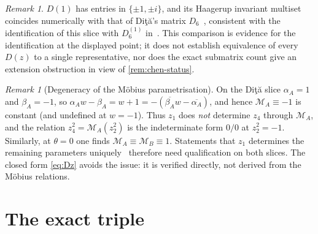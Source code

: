 \documentclass[11pt]{article}
\numberwithin{equation}{section}
\theoremstyle{plain}
\theoremstyle{definition}
\theoremstyle{remark}
\newtheorem{remark}[theorem]{Remark}
\newcommand{\Dita}{\texorpdfstring{Di\c{t}\u{a}}{Dita}}
\begin{document}
\begin{remark}\label{rem:dita-class}
$D(1)$ has entries in $\{\pm1,\pm i\}$, and its Haagerup invariant multiset coincides numerically with that of \Dita{}'s matrix $D_6$~\cite{Dita2004}, consistent with the identification of this slice with $D_6^{(1)}$ in~\cite{McNultyWeigert2026}. This comparison is evidence for the identification at the displayed point; it does not establish equivalence of every $D(z)$ to a single representative, nor does the exact submatrix count give an extension obstruction in view of \cref{rem:chen-status}.
\end{remark}

\begin{remark}[Degeneracy of the M\"obius parametrisation]\label{rem:mobius}
On the \Dita{} slice $\alpha_A=1$ and $\beta_A=-1$, so $\alpha_Aw-\beta_A=w+1=-(\overline{\beta_A}w-\overline{\alpha_A})$, and hence $\mathcal M_A\equiv-1$ is constant (and undefined at $w=-1$). Thus $z_1$ does \emph{not} determine $z_4$ through $\mathcal M_A$, and the relation $z_4^2=\mathcal M_A(z_2^2)$ is the indeterminate form $0/0$ at $z_2^2=-1$. Similarly, at $\theta=0$ one finds $\mathcal M_A\equiv\mathcal M_B\equiv1$. Statements that $z_1$ determines the remaining parameters uniquely~\cite{McNultyWeigert2026} therefore need qualification on both slices. The closed form \eqref{eq:Dz} avoids the issue: it is verified directly, not derived from the M\"obius relations.
\end{remark}

\section{The exact triple}\label{sec:main}
\end{document}
